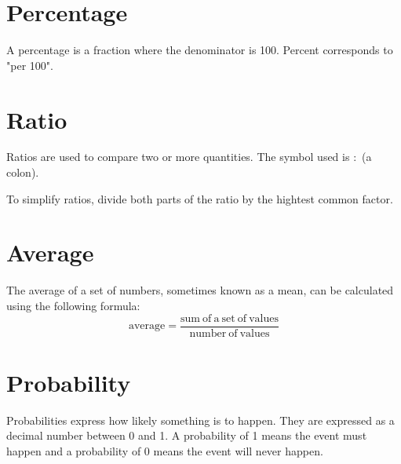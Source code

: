 
\section*{Percentage}
A percentage is a fraction where the denominator is 100. Percent corresponds to "per 100". 

\section*{Ratio}
Ratios are used to compare two or more quantities. The symbol used is $:$ (a colon). 

To simplify ratios, divide both parts of the ratio by the hightest common factor. 

\section*{Average}
The average of a set of numbers, sometimes known as a mean, can be calculated using the following formula:
\[\displaystyle \mathrm{average} = \frac{\mathrm{sum\ of\ a\ set\ of\ values}}{\mathrm{number\ of\ values}}\]

\section*{Probability}
Probabilities express how likely something is to happen. They are expressed as a decimal number between 0 and 1. A probability of 1 means the event must happen and a probability of 0 means the event will never happen. 